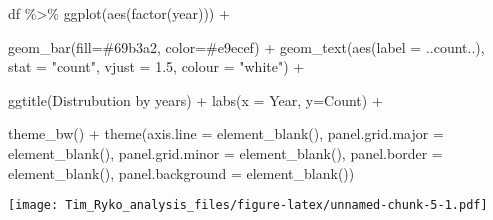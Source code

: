\documentclass[
]{article}
\newenvironment{Shaded}{\begin{snugshade}}{\end{snugshade}}
\newcommand{\AttributeTok}[1]{\textcolor[rgb]{0.77,0.63,0.00}{#1}}
\newcommand{\FloatTok}[1]{\textcolor[rgb]{0.00,0.00,0.81}{#1}}
\newcommand{\FunctionTok}[1]{\textcolor[rgb]{0.00,0.00,0.00}{#1}}
\newcommand{\NormalTok}[1]{#1}
\newcommand{\SpecialCharTok}[1]{\textcolor[rgb]{0.00,0.00,0.00}{#1}}
\newcommand{\StringTok}[1]{\textcolor[rgb]{0.31,0.60,0.02}{#1}}
\begin{document}
\begin{Shaded}
\begin{Highlighting}[]
\NormalTok{df }\SpecialCharTok{\%\textgreater{}\%}
  \FunctionTok{ggplot}\NormalTok{(}\FunctionTok{aes}\NormalTok{(}\FunctionTok{factor}\NormalTok{(year))) }\SpecialCharTok{+}
    
    \FunctionTok{geom\_bar}\NormalTok{(}\AttributeTok{fill=}\StringTok{\textquotesingle{}\#69b3a2\textquotesingle{}}\NormalTok{, }\AttributeTok{color=}\StringTok{\textquotesingle{}\#e9ecef\textquotesingle{}}\NormalTok{) }\SpecialCharTok{+}
    \FunctionTok{geom\_text}\NormalTok{(}\FunctionTok{aes}\NormalTok{(}\AttributeTok{label =}\NormalTok{ ..count..), }\AttributeTok{stat =} \StringTok{"count"}\NormalTok{, }\AttributeTok{vjust =} \FloatTok{1.5}\NormalTok{, }\AttributeTok{colour =} \StringTok{"white"}\NormalTok{) }\SpecialCharTok{+}
    
    \FunctionTok{ggtitle}\NormalTok{(}\StringTok{\textquotesingle{}Distrubution by years\textquotesingle{}}\NormalTok{) }\SpecialCharTok{+}
    \FunctionTok{labs}\NormalTok{(}\AttributeTok{x =} \StringTok{\textquotesingle{}Year\textquotesingle{}}\NormalTok{, }\AttributeTok{y=}\StringTok{\textquotesingle{}Count\textquotesingle{}}\NormalTok{) }\SpecialCharTok{+}
    
    \FunctionTok{theme\_bw}\NormalTok{() }\SpecialCharTok{+}
    \FunctionTok{theme}\NormalTok{(}\AttributeTok{axis.line =} \FunctionTok{element\_blank}\NormalTok{(),}
      \AttributeTok{panel.grid.major =} \FunctionTok{element\_blank}\NormalTok{(),}
      \AttributeTok{panel.grid.minor =} \FunctionTok{element\_blank}\NormalTok{(),}
      \AttributeTok{panel.border =} \FunctionTok{element\_blank}\NormalTok{(),}
      \AttributeTok{panel.background =} \FunctionTok{element\_blank}\NormalTok{())}
\end{Highlighting}
\end{Shaded}

\texttt{[image: Tim\_Ryko\_analysis\_files/figure-latex/unnamed-chunk-5-1.pdf]}
\end{document}
